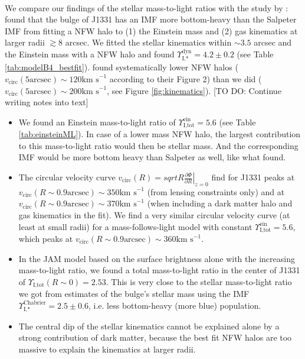 \\We compare our findings of the stellar mass-to-light ratios with the study by \cite{SWELLSV}: \cite{SWELLSV} found that the bulge of J1331 has an IMF more bottom-heavy than the Salpeter IMF from fitting a NFW halo to (1) the Einstein mass and (2) gas kinematics at larger radii $\gtrsim 8$ arcsec. We fitted the stellar kinematics within $\sim 3.5$ arcsec and the Einstein mass with a NFW halo and found $\Upsilon_\text{I,*}^\text{dyn} = 4.2 \pm 0.2$ (see Table \ref{tab:modelB4_bestfit}). \cite{SWELLSV}  found systematically lower NFW halos ($v_\text{circ}(5\text{arcsec}) \sim 120 \text{km s}^{-1}$ according to their Figure 2) than we did ($v_\text{circ}(5\text{arcsec}) \sim 200 \text{km s}^{-1}$, see Figure \ref{fig:kinematics}). [TO DO: Continue writing notes into text]
\begin{itemize}
\item We found an Einstein mass-to-light ratio of $\Upsilon_\text{I,tot}^\text{ein} = 5.6$ (see Table \ref{tab:einsteinML}). In case of a lower mass NFW halo, the largest contribution to this mass-to-light ratio would then be stellar mass. And the corresponding IMF would be more bottom heavy than Salpeter as well, like what \citet{SWELLSV} found.
\item The circular velocity curve $v_\text{circ}(R) = \left. sqrt{R \frac{\partial \Phi}{\partial R}} \right|_{z=0}$ \citet{SWELLSV} find for J1331 peaks at $v_\text{circ}(R\sim0.9 \text{arcsec}) \sim 350 \text{km s}^{-1}$ (from lensing constraints only) and at $v_\text{circ}(R\sim0.9 \text{arcsec}) \sim 370 \text{km s}^{-1}$ (when including a dark matter halo and gas kinematics in the fit). We find a very similar circular velocity curve (at least at small radii) for a mass-follows-light model with constant $\Upsilon_\text{I,tot}^\text{ein} = 5.6$, which peaks at $v_\text{circ}(R\sim0.9 \text{arcsec}) \sim 360 \text{km s}^{-1}$.
\item In the JAM model based on the surface brightness alone with the increasing mass-to-light ratio, we found a total mass-to-light ratio in the center of J1331 of  $\Upsilon_\text{I,tot}(R\sim0) = 2.53$. This is very close to the stellar mass-to-light ratio we got from \citet{SWELLSI} estimates of the bulge's stellar mass using the \citet{Chabrier2003} IMF $\Upsilon_\text{I,*}^\text{Chabrier} = 2.5 \pm 0.6$, i.e. less bottom-heavy (more blue) population.
\item The central dip of the stellar kinematics cannot be explained alone by a strong contribution of dark matter, because the best fit NFW halos are too massive to explain the kinematics at larger radii.

\end{itemize}
